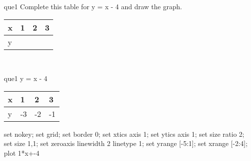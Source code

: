 \documentclass[13.5pt, varwidth=true]{beamer}
\begin{document}
\begin{frame}[shrink=19,fragile]
	\begin{beamercolorbox}[rounded=true, left, shadow=true,wd=14.8cm]{que1}
		 Complete this table for y = x - 4 and draw the graph. \\[0.3cm] \renewcommand{\arraystretch}{1.2}\begin{tabular}{|C|C|C|C|} \hline x & 1 & 2 & 3 \\ \hline y & & & \\ \hline \end{tabular}\\[0.3cm]
	\end{beamercolorbox}
\end{frame}
\begin{frame}[shrink=19,fragile]
	\begin{beamercolorbox}[rounded=true, left, shadow=true,wd=14.8cm]{que1}
		y = x - 4\renewcommand{\arraystretch}{1.2}\begin{tabular}{|C|C|C|C|} \hline x & 1 & 2 & 3 \\ \hline y & -3 & -2 & -1\\ \hline \end{tabular}\begin{gnuplot}[terminal=pdf] set nokey; set grid; set border 0; set xtics axis 1; set ytics axis 1; set size ratio 2; set size 1,1; set zeroaxis linewidth 2 linetype 1; set yrange [-5:1]; set xrange [-2:4]; plot 1*x+-4 \end{gnuplot}
	\end{beamercolorbox}
\end{frame}
\end{document}
